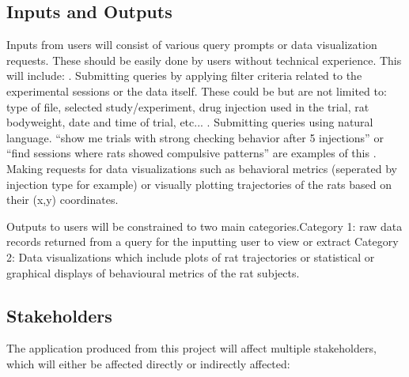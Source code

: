 \documentclass{article}
\begin{document}
\subsection{Inputs and Outputs}


\par{Inputs from users will consist of various query prompts or data visualization requests. These should be easily done
by users without technical experience. This will include: \newline \newline {}. Submitting queries by applying filter criteria related to the experimental sessions or the data itself.
These could be but are not limited to: type of file, selected study/experiment, drug injection used in the trial,
rat bodyweight, date and time of trial, etc... \newline \newline {}. Submitting queries using natural language. “show me trials with strong checking behavior after 5 injections”
or “find sessions where rats showed compulsive patterns” are examples of this \newline \newline {}. Making requests for data visualizations such as behavioral metrics (seperated by injection type for example) or visually plotting trajectories of the rats
based on their (x,y) coordinates.}
\newline

\par{Outputs to users will be constrained to two main categories.\newline \newline \indent Category 1: raw data records returned from a query for the inputting user to view or extract
\newline \newline \indent Category 2: Data visualizations which include plots of rat trajectories or statistical or graphical displays of behavioural metrics of the rat subjects.}

\subsection{Stakeholders}

\par{The application produced from this project will affect multiple stakeholders, which will either be affected directly or indirectly affected:}
\end{document}

